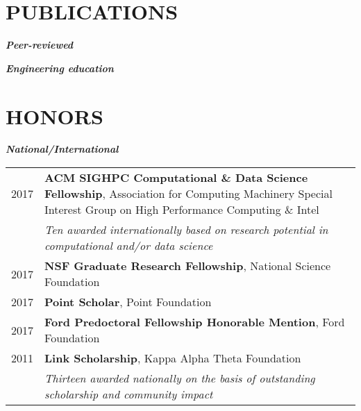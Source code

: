 \documentclass[11pt]{article}
\newcommand{\quotejump}{\vspace{0.5em}}
\begin{document}
\section{PUBLICATIONS}
\textbf{\textit{Peer-reviewed}}
\begin{quote}
\end{quote}

\textbf{\textit{Engineering education}}
\begin{quote}
\end{quote}



\section{HONORS}
\textbf{\textit{National/International}}\quotejump
\begin{longtable}{R{2.2cm} L{14.8cm}}
2017 & \textbf{ACM SIGHPC Computational \& Data Science Fellowship}, Association for Computing Machinery Special Interest Group on High Performance Computing \& Intel  \\
& \footnotesize{\textit{Ten awarded internationally based on research potential in computational and/or data science}} \\
2017 & \textbf{NSF Graduate Research Fellowship}, National Science Foundation \\
2017 & \textbf{Point Scholar}, Point Foundation \\ %
2017 & \textbf{Ford Predoctoral Fellowship Honorable Mention}, Ford Foundation \\
2011 & \textbf{Link Scholarship}, Kappa Alpha Theta Foundation \\
& \footnotesize{\textit{Thirteen awarded nationally on the basis of outstanding scholarship and community impact}} \\
\end{longtable}
\end{document}
